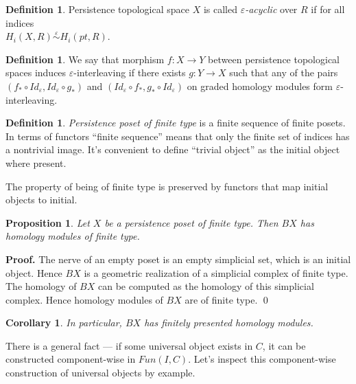\documentclass[a4paper, 12pt]{article}
\newcounter{stmcounter}[section]
\numberwithin{equation}{section}
\newtheorem{proposition}[stmcounter]{Proposition}
\newtheorem{corollary}[stmcounter]{Corollary}
\theoremstyle{definition}
\newtheorem{definition}[stmcounter]{Definition}
\theoremstyle{remark}
\newenvironment{pf}{\noindent\textbf{Proof.}}{\qed}
\newcommand{\define}[1]{{\textit{#1}}}
\begin{document}
\begin{definition}
  Persistence topological space $X$ is called \define{$\varepsilon$-acyclic} over $R$ if for all indices\\ $H_i(X,R) \stackrel{\varepsilon}{\sim} H_i(pt,R)$.
\end{definition}

\begin{definition}
  We say that morphism $f : X \to Y$ between persistence topological spaces induces $\varepsilon$-interleaving if there exists $g : Y \to X$ such that any of the pairs $(f_* \circ Id_{\varepsilon}, Id_{\varepsilon} \circ g_*)$ and $(Id_{\varepsilon} \circ f_*, g_* \circ Id_{\varepsilon})$ on graded homology modules form $\varepsilon$-interleaving.
\end{definition}

\begin{definition}
  \define{Persistence poset of finite type} is a finite sequence of finite posets.\\

  In terms of functors ``finite sequence'' means that only the finite set of indices has a nontrivial image. It's convenient to define ``trivial object'' as the initial object where present.
\end{definition}

The property of being of finite type is preserved by functors that map initial objects to initial.\\

\begin{proposition}
  Let $X$ be a persistence poset of finite type. Then $BX$ has homology modules of finite type.
\end{proposition}

\begin{pf}
  The nerve of an empty poset is an empty simplicial set, which is an initial object. Hence $BX$ is a geometric realization of a simplicial complex of finite type. The homology of $BX$ can be computed as the homology of this simplicial complex. Hence homology modules of $BX$ are of finite type.
\end{pf}\\

\begin{corollary}
  In particular, $BX$ has finitely presented homology modules.
\end{corollary}

There is a general fact --- if some universal object exists in $C$, it can be constructed component-wise in $Fun(I,C)$. Let's inspect this component-wise construction of universal objects by example.\\
\end{document}
